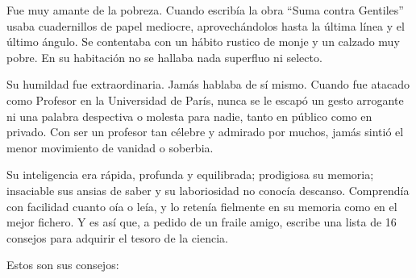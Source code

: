\documentclass{article}
\begin{document}
    Fue muy amante de la pobreza. Cuando escribía la obra ``Suma contra Gentiles'' usaba cuadernillos de papel mediocre, aprovechándolos hasta la última línea y el último ángulo. Se contentaba con un hábito rustico de monje y un calzado muy pobre. En su habitación no se hallaba nada superfluo ni selecto. \par
    
    Su humildad fue extraordinaria. Jamás hablaba de sí mismo. Cuando fue atacado como Profesor en la Universidad de París, nunca se le escapó un gesto arrogante ni una palabra despectiva o molesta para nadie, tanto en público como en privado. Con ser un profesor tan célebre y admirado por muchos, jamás sintió el menor movimiento de vanidad o soberbia. \par
    
    Su inteligencia era rápida, profunda y equilibrada; prodigiosa su memoria; insaciable sus ansias de saber y su laboriosidad no conocía descanso. Comprendía con facilidad cuanto oía o leía, y lo retenía fielmente en su memoria como en el mejor fichero. Y es así que, a pedido de un fraile amigo, escribe una lista de 16 consejos para adquirir el tesoro de la ciencia. \par
    
    Estos son sus consejos: \par
\end{document}
